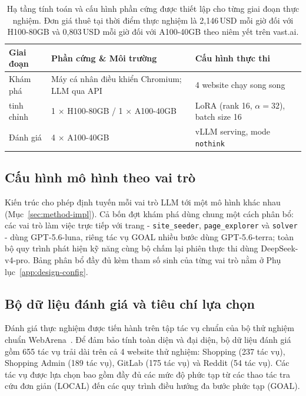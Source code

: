\begin{table}[htbp]
  \centering
  \caption[Hạ tầng tính toán và cấu hình phần cứng]{Hạ tầng tính toán và cấu hình phần cứng được thiết lập cho từng giai đoạn thực nghiệm. Đơn giá thuê tại thời điểm thực nghiệm là 2{,}146\,USD mỗi giờ đối với H100-80GB và 0{,}803\,USD mỗi giờ đối với A100-40GB theo niêm yết trên vast.ai.}
  \label{tab:infra}
  \small
  \begin{tabular}{@{}L{2.5cm} L{5.2cm} R{4.5cm}@{}}
    \toprule
    \textbf{Giai đoạn} & \textbf{Phần cứng \& Môi trường} & \textbf{Cấu hình thực thi} \\
    \midrule
    Khám phá & Máy cá nhân điều khiển Chromium; LLM qua API & 4 website chạy song song \\
    tinh chỉnh & 1 $\times$ H100-80GB / 1 $\times$ A100-40GB & LoRA (rank 16, $\alpha=32$), batch size 16 \\
    Đánh giá & 4 $\times$ A100-40GB & vLLM serving, mode \texttt{nothink} \\
    \bottomrule
  \end{tabular}
\end{table}

\subsection{Cấu hình mô hình theo vai trò}
Kiến trúc cho phép định tuyến mỗi vai trò LLM tới một mô hình khác nhau (Mục~\ref{sec:method-impl}). Cả bốn đợt khám phá dùng chung một cách phân bổ: các vai trò làm việc trực tiếp với trang - \texttt{site\_seeder}, \texttt{page\_explorer} và \texttt{solver} - dùng GPT-5.6-luna, riêng tác vụ GOAL nhiều bước dùng GPT-5.6-terra; toàn bộ quy trình phát hiện kỹ năng cùng bộ chấm lại phiên thực thi dùng DeepSeek-v4-pro. Bảng phân bổ đầy đủ kèm tham số sinh của từng vai trò nằm ở Phụ lục~\ref{app:design-config}.

\subsection{Bộ dữ liệu đánh giá và tiêu chí lựa chọn}
\label{sec:exp-dataset-select}

Đánh giá thực nghiệm được tiến hành trên tập tác vụ chuẩn của bộ thử nghiệm chuẩn WebArena~\cite{zhou2024webarena}. Để đảm bảo tính toàn diện và đại diện, bộ dữ liệu đánh giá gồm 655 tác vụ trải dài trên cả 4 website thử nghiệm: Shopping (237 tác vụ), Shopping Admin (189 tác vụ), GitLab (175 tác vụ) và Reddit (54 tác vụ). Các tác vụ được lựa chọn bao gồm đầy đủ các mức độ phức tạp từ các thao tác tra cứu đơn giản (LOCAL) đến các quy trình điều hướng đa bước phức tạp (GOAL).

